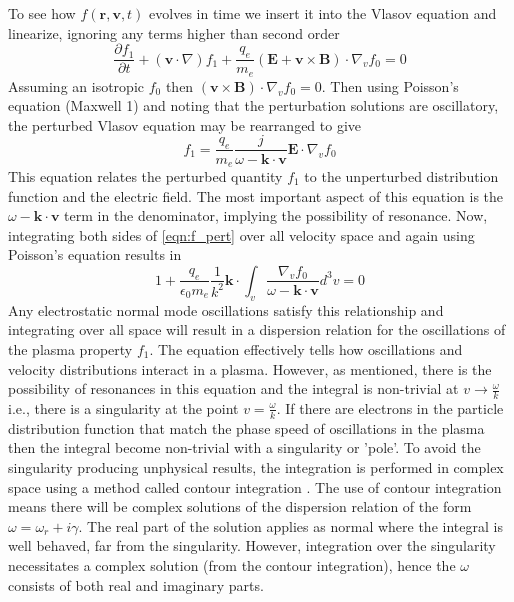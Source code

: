 To see how $f(\mathbf{r}, \mathbf{v}, t)$ evolves in time we insert it into the Vlasov equation and linearize, ignoring any terms higher than second order
\begin{equation}
\frac{\partial f_1}{\partial t} + (\mathbf{v}\cdot \nabla)f_1 +\frac{q_e}{m_e}(\mathbf{E} + \mathbf{v}\times \mathbf{B})\cdot\nabla_vf_0=0
\end{equation}
Assuming an isotropic $f_0$ then $(\mathbf{v}\times \mathbf{B})\cdot\nabla_vf_0=0$. Then using Poisson's equation (Maxwell 1) and noting that the perturbation solutions are oscillatory, the perturbed Vlasov equation may be rearranged to give
\begin{equation}
f_1=\frac{q_e}{m_e}\frac{j}{\omega-\mathbf{k\cdot v}}\mathbf{E}\cdot\nabla_vf_0
\label{eqn:f_pert}
\end{equation}
This equation relates the perturbed quantity $f_1$ to the unperturbed distribution function and the electric field. The most important aspect of this equation is the $\omega-\mathbf{k\cdot v}$ term in the denominator, implying the possibility of resonance. Now, integrating both sides of \ref{eqn:f_pert} over all velocity space and again using Poisson's equation results in
\begin{equation}
1+\frac{q_e}{\epsilon_0m_e}\frac{1}{k^2}\mathbf{k}\cdot\int_v\frac{\nabla_v f_0}{\omega-\mathbf{k\cdot v}}d^3v=0
\end{equation}
Any electrostatic normal mode oscillations satisfy this relationship and integrating over all space will result in a dispersion relation for the oscillations of the plasma property $f_1$. The equation effectively tells how oscillations and velocity distributions interact in a plasma. However, as mentioned, there is the possibility of resonances in this equation and the integral is non-trivial at $v \rightarrow \frac{\omega}{k}$ i.e., there is a singularity at the point $v = \frac{\omega}{k}$. If there are electrons in the particle distribution function that match the phase speed of oscillations in the plasma then the integral become non-trivial with a singularity or 'pole'. To avoid the singularity producing unphysical results, the integration is performed in complex space using a method called contour integration  \citep{melrose1989}. The use of contour integration means there will be complex solutions of the dispersion relation of the form $\omega = \omega_r + i\gamma$.
The real part of the solution applies as normal where the integral is well behaved, far from the singularity. However, integration over the singularity necessitates a complex solution (from the contour integration), hence the $\omega$ consists of both real and imaginary parts.
